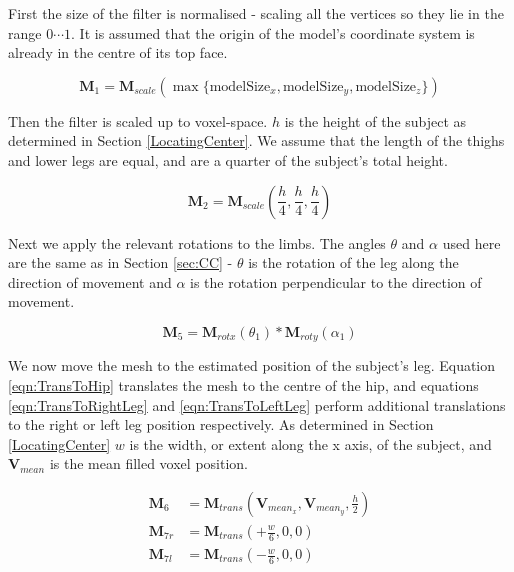 \bigskip
First the size of the filter is normalised - scaling all the vertices so they lie in the range ${0 \cdots 1}$.
It is assumed that the origin of the model's coordinate system is already in the centre of its top face.

\begin{equation}
	\mathbf{M}_{1} = \mathbf{M}_{scale}(\max \{\text{modelSize}_{x}, \text{modelSize}_{y}, \text{modelSize}_{z} \})
\end{equation}

Then the filter is scaled up to voxel-space.
$h$ is the height of the subject as determined in Section \ref{LocatingCenter}.
We assume that the length of the thighs and lower legs are equal, and are a quarter of the subject's total height.

\begin{equation}
	\mathbf{M}_{2} = \mathbf{M}_{scale}(\frac{h}{4}, \frac{h}{4}, \frac{h}{4})
\end{equation}

Next we apply the relevant rotations to the limbs.
The angles $\theta$ and $\alpha$ used here are the same as in Section \ref{sec:CC} -
$\theta$ is the rotation of the leg along the direction of movement and $\alpha$ is the rotation perpendicular to the direction of movement.

\begin{equation}
	\mathbf{M}_{5} = \mathbf{M}_{rotx}(\theta_{1}) * \mathbf{M}_{roty}(\alpha_{1})
\end{equation}

We now move the mesh to the estimated position of the subject's leg.
Equation \ref{eqn:TransToHip} translates the mesh to the centre of the hip, and equations \ref{eqn:TransToRightLeg} and \ref{eqn:TransToLeftLeg} perform additional
translations to the right or left leg position respectively.
As determined in Section \ref{LocatingCenter} $w$ is the width, or extent along the x axis, of the subject,
and $\mathbf{V}_{mean}$ is the mean filled voxel position.

\begin{align}
	\label{eqn:TransToHip}      \mathbf{M}_{6}  &= \mathbf{M}_{trans}(\mathbf{V}_{mean_{x}}, \mathbf{V}_{mean_{y}}, \frac{h}{2}) \\
	\label{eqn:TransToRightLeg} \mathbf{M}_{7r} &= \mathbf{M}_{trans}(+\frac{w}{6}, 0, 0) \\
	\label{eqn:TransToLeftLeg}  \mathbf{M}_{7l} &= \mathbf{M}_{trans}(-\frac{w}{6}, 0, 0)
\end{align}

